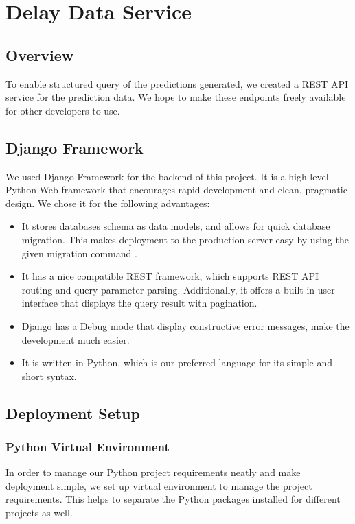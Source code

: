 \chapter{Delay Data Service}
\label{ch:data_service}
\section{Overview}
\par To enable structured query of the predictions generated, we created a REST API service for the prediction data. We hope to make these endpoints freely available for other developers to use.

\section{Django Framework}
\par We used Django Framework\cite{django_framework} for the backend of this project. It is a high-level Python Web framework that encourages rapid development and clean, pragmatic design. We chose it for the following advantages:

\begin{itemize}
  \item It stores databases schema as data models\cite{django_model}, and allows for quick database migration. This makes deployment to the production server easy by using the given migration command \cite{django_migrations}.
  \item It has a nice compatible REST framework\cite{django_rest}, which supports REST API routing\cite{django_rest_routing} and query parameter parsing. Additionally, it offers a built-in user interface that displays the query result with pagination\cite{django_rest_pagination}.
  \item Django has a Debug mode that display constructive error messages, make the development much easier.
  \item It is written in Python, which is our preferred language for its simple and short syntax.
\end{itemize}

\section{Deployment Setup}
\subsection{Python Virtual Environment}
\par In order to manage our Python project requirements neatly and make deployment simple, we set up virtual environment\cite{virtualenv} \cite{virtualenvwrapper} to manage the project requirements. This helps to separate the Python packages installed for different projects as well.

